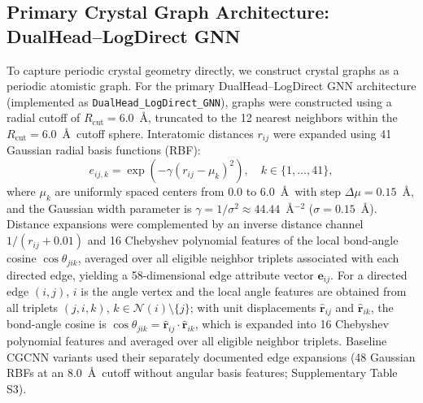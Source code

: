 \documentclass[final,3p,times]{elsarticle}
\begin{document}
\subsection{Primary Crystal Graph Architecture: DualHead--LogDirect GNN}
To capture periodic crystal geometry directly, we construct crystal graphs as a periodic atomistic graph. For the primary DualHead--LogDirect GNN architecture (implemented as \texttt{DualHead\_LogDirect\_GNN}), graphs were constructed using a radial cutoff of $R_{\mathrm{cut}} = 6.0$~\AA, truncated to the 12 nearest neighbors within the $R_{\mathrm{cut}} = 6.0$~\AA\ cutoff sphere. Interatomic distances $r_{ij}$ were expanded using 41 Gaussian radial basis functions (RBF):
\begin{equation}
    e_{ij, k} = \exp\left(-\gamma (r_{ij} - \mu_k)^2\right), \quad k \in \{1, \dots, 41\},
\end{equation}
where $\mu_k$ are uniformly spaced centers from $0.0$ to $6.0$~\AA\ with step $\Delta\mu = 0.15$~\AA, and the Gaussian width parameter is $\gamma = 1/\sigma^2 \approx 44.44$~\AA$^{-2}$ ($\sigma = 0.15$~\AA). Distance expansions were complemented by an inverse distance channel $1/(r_{ij} + 0.01)$ and 16 Chebyshev polynomial features of the local bond-angle cosine $\cos\theta_{jik}$, averaged over all eligible neighbor triplets associated with each directed edge, yielding a 58-dimensional edge attribute vector $\mathbf{e}_{ij}$. For a directed edge $(i, j)$, $i$ is the angle vertex and the local angle features are obtained from all triplets $(j, i, k)$, $k \in \mathcal{N}(i) \setminus \{j\}$; with unit displacements $\hat{\mathbf{r}}_{ij}$ and $\hat{\mathbf{r}}_{ik}$, the bond-angle cosine is $\cos\theta_{jik} = \hat{\mathbf{r}}_{ij} \cdot \hat{\mathbf{r}}_{ik}$, which is expanded into 16 Chebyshev polynomial features and averaged over all eligible neighbor triplets. Baseline CGCNN variants used their separately documented edge expansions (48 Gaussian RBFs at an $8.0$~\AA\ cutoff without angular basis features; Supplementary Table S3).
\end{document}
